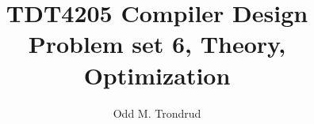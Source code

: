 \setlength{\headheight}{15pt} %
\setlength{\headsep}{30pt} %
\pagestyle{fancy} 

\title{TDT4205 Compiler Design\\
	\textbf{Problem set 6, Theory, Optimization}}
\author{Odd M. Trondrud}

\chead{}


